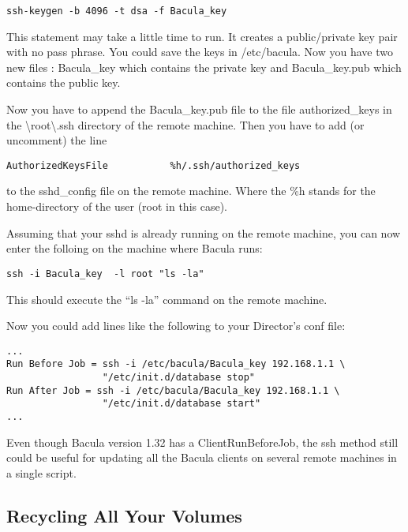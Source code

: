 {\footnotesize
\begin{verbatim}
ssh-keygen -b 4096 -t dsa -f Bacula_key
\end{verbatim}
\normalsize

This statement may take a little time to run. It creates a public/private key
pair with no pass phrase. You could save the keys in /etc/bacula. Now you have
two new files : Bacula\_key which contains the private key and Bacula\_key.pub
which contains the public key. 

Now you have to append the Bacula\_key.pub file to the file authorized\_keys
in the \textbackslash{}root\textbackslash{}.ssh directory of the remote
machine. Then you have to add (or uncomment) the line 

\footnotesize
\begin{verbatim}
AuthorizedKeysFile           %h/.ssh/authorized_keys
\end{verbatim}
\normalsize

to the sshd\_config file on the remote machine. Where the \%h stands for the
home-directory of the user (root in this case). 

Assuming that your sshd is already running on the remote machine, you can now
enter the folloing on the machine where Bacula runs: 

\footnotesize
\begin{verbatim}
ssh -i Bacula_key  -l root "ls -la"
\end{verbatim}
\normalsize

This should execute the ``ls -la'' command on the remote machine. 

Now you could add lines like the following to your Director's conf file: 

\footnotesize
\begin{verbatim}
...
Run Before Job = ssh -i /etc/bacula/Bacula_key 192.168.1.1 \
                 "/etc/init.d/database stop"
Run After Job = ssh -i /etc/bacula/Bacula_key 192.168.1.1 \
                 "/etc/init.d/database start"
...
\end{verbatim}
\normalsize

Even though Bacula version 1.32 has a ClientRunBeforeJob, the ssh method still
could be useful for updating all the Bacula clients on several remote machines
in a single script. 

\subsection*{Recycling All Your Volumes}
\label{recycle}

}
